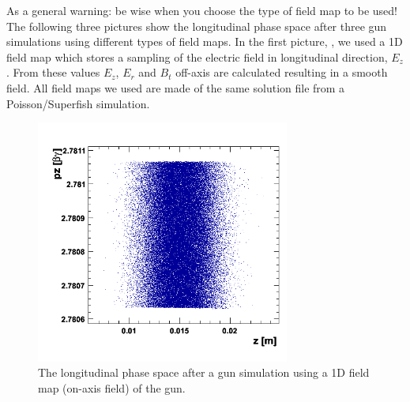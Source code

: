 \clearpage

\leftpointright As a general warning: be wise when you choose the type of field map to be used! The following three pictures show the longitudinal phase space after three gun simulations using different types of field maps. In the first picture, , we used a 1D field map which stores a sampling of the electric field in longitudinal direction, $E_z$. From these values $E_z$, $E_r$ and $B_t$ off-axis are calculated resulting in a smooth field. All field maps we used are made of the same solution file from a Poisson/Superfish simulation.
\begin{figure}
  \begin{center}
  \includegraphics[origin=bl,height=80mm,angle=0]{./figures/Fieldmaps/1DDynamic_step82.png}
  \caption{\label{fig:1ddynamic_step82}
    The longitudinal phase space after a gun simulation using a 1D field map (on-axis field) of the gun.
  }
  \end{center}
%
\end{figure}

